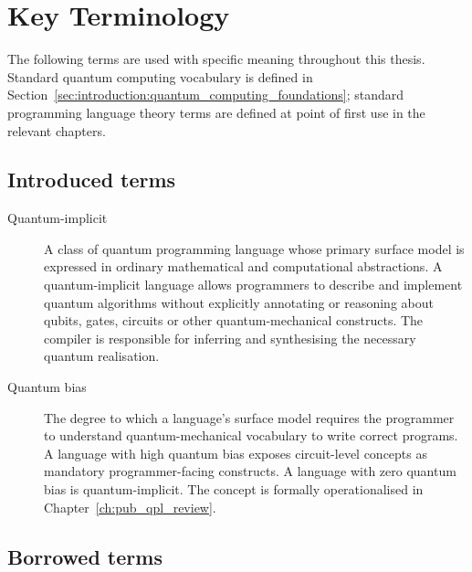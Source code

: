 \section{Key Terminology}\label{sec:introduction:terminology}
The following terms are used with specific meaning throughout this thesis.
Standard quantum computing vocabulary is defined in Section~\ref{sec:introduction:quantum_computing_foundations}; standard programming language theory terms are defined at point of first use in the relevant chapters.

\subsection{Introduced terms}\label{subsec:introduction:terminology:introduced_terms}

\begin{description}
    \item[Quantum-implicit] A class of quantum programming language whose primary surface model is expressed in ordinary mathematical and computational abstractions.
    A quantum-implicit language allows programmers to describe and implement quantum algorithms without explicitly annotating or reasoning about qubits, gates, circuits or other quantum-mechanical constructs.
    The compiler is responsible for inferring and synthesising the necessary quantum realisation.

    \item[Quantum bias] The degree to which a language's surface model requires the programmer to understand quantum-mechanical vocabulary to write correct programs.
    A language with high quantum bias exposes circuit-level concepts as mandatory programmer-facing constructs.
    A language with zero quantum bias is quantum-implicit.
    The concept is formally operationalised in Chapter~\ref{ch:pub_qpl_review}.
\end{description}

\subsection{Borrowed terms}\label{subsec:introduction:terminology:borrowed_terms}


